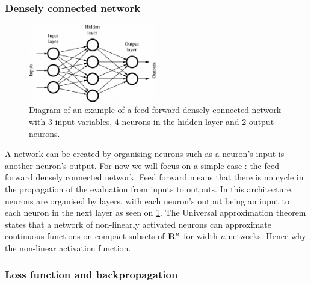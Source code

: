\subsubsection{Densely connected network}


\begin{figure}
    \centering
    \includegraphics[width=0.5\textwidth]{Images/dense_network.png}
    \caption{Diagram of an example of a feed-forward densely connected network with 3 input variables, 4 neurons in the hidden layer and 2 output neurons.}
    \label{fig:dense_network}
\end{figure}

A network can be created by organising neurons such as a neuron's input is another neuron's output.
For now we will focus on a simple case : the feed-forward densely connected network.
Feed forward means that there is no cycle in the propagation of the evaluation from inputs to outputs.
In this architecture, neurons are organised by layers, with each neuron's output being an input to each neuron in the next layer as seen on \ref{fig:dense_network}.
The Universal approximation theorem states that a network of non-linearly activated neurons can approximate continuous functions on compact subsets of ${\rm I\!R}^{n}$ for width-$n$ networks. Hence why the non-linear activation function.

\subsubsection{Loss function and backpropagation}

